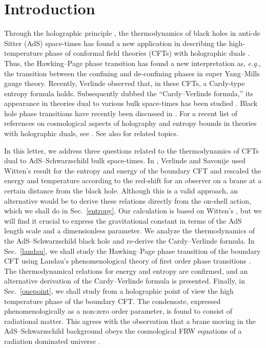 \documentclass[a4paper,12pt]{article}
\begin{document}
\section{Introduction}
Through the holographic principle \cite{tHooft93,Susskind95}, the
thermodynamics of black holes in anti-de Sitter (AdS) space-times
\cite{Hawking83,Brown94} has found a new application in describing the
high-temperature phase of conformal field theories (CFTs) with holographic
duals \cite{Witten98-2}. Thus, the Hawking--Page phase transition has found
a new interpretation as, \emph{e.g.}, the transition between the confining
and de-confining phases in \coordHE{} super Yang--Mills gauge theory.
Recently, Verlinde \cite{Verlinde00} observed that, in these CFTs, a
Cardy-type entropy formula \cite{Cardy86} holds. Subsequently dubbed the
``Cardy--Verlinde formula,'' its appearance in theories dual to various
bulk space-times has been studied
\cite{Lin00,Nojiri00,Cai01a,Biswas01,Nojiri01a,
Birmingham01,Klemm01b,Youm01a,Nojiri01b,Youm01b,Nojiri01c,Cai01c,Youm01c,Wang01b}.
Black hole phase transitions have recently been discussed in
\cite{Surya01,Stephens01,Creminelli01}.  For a recent list of references on
cosmological aspects of holography and entropy bounds in theories with
holographic duals, see \cite{Youm01c}. See also
\cite{Shiromizu01a,Shiromizu01b} for related topics.

In this letter, we address three questions related to the
thermodynamics of CFTs dual to AdS--Schwarzschild bulk space-times. In
\cite{Verlinde00,Savonije01}, Verlinde and Savonije used Witten's
result \cite{Witten98-2} for the entropy and energy of the boundary
CFT and rescaled the energy and temperature according to the red-shift for
an observer on a brane at a certain distance from the black hole. Although this
is a valid approach, an alternative would be to derive these relations
directly from the on-shell action, which we shall do in Sec.\
\ref{entropy}. Our calculation is based on Witten's \cite{Witten98-2},
but we will find it crucial to express the gravitational
constant in terms of the AdS length scale and a dimensionless
parameter. We analyze the thermodynamics of the AdS--Schwarzschild
black hole and re-derive the Cardy--Verlinde formula.
In Sec.\ \ref{landau}, we shall study the Hawking--Page
phase transition of the boundary CFT using Landau's phenomenological
theory of first order phase transitions \cite{Landau9}. The
thermodynamical relations for energy and entropy are confirmed, and an
alternative derivation of the Cardy--Verlinde formula is presented.
Finally, in Sec.\ \ref{onepoint}, we shall study from a
holographic point of view the high temperature phase of the boundary
CFT. The condensate, expressed phenomenologically as a non-zero order
parameter, is found to consist of radiational matter. This agrees with the
observation that a brane moving in the AdS--Schwarzschild background
obeys the cosmological FRW equations of a radiation dominated
universe \cite{Gubser99}.
\end{document}

